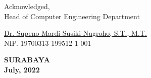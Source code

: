  \vspace{2ex}

  \begin{center}
    Acknowledged, \\
    Head of Computer Engineering Department\\

    \vspace{8ex}

    \underline{Dr. Supeno Mardi Susiki Nugroho, S.T., M.T.} \\
    NIP. 19700313 199512 1 001
  \end{center}

  \begin{center}
    \textbf{SURABAYA\\July, 2022}
  \end{center}
\endgroup
